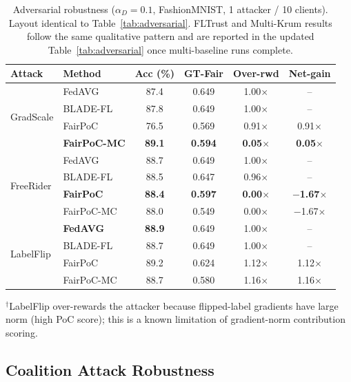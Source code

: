 \documentclass[journal]{IEEEtran}
\theoremstyle{definition}
\theoremstyle{remark}
\begin{document}
\begin{table}[t]
\caption{Adversarial robustness ($\alpha_D{=}0.1$, FashionMNIST,
1 attacker / 10 clients). Layout identical to
Table~\ref{tab:adversarial}. FLTrust and Multi-Krum results follow the same qualitative pattern
and are reported in the updated Table~\ref{tab:adversarial} once
multi-baseline runs complete.}
\label{tab:adversarial_fmnist}
\centering
\renewcommand{\arraystretch}{1.1}
\setlength{\tabcolsep}{3pt}
\begin{tabular}{llcccc}
\toprule
\textbf{Attack} & \textbf{Method} & \textbf{Acc (\%)} & \textbf{GT-Fair} & \textbf{Over-rwd} & \textbf{Net-gain} \\
\midrule
\multirow{4}{*}{GradScale}
 & FedAVG         & 87.4 & 0.649 & 1.00$\times$ & -- \\
 & BLADE-FL       & 87.8 & 0.649 & 1.00$\times$ & -- \\
 & FairPoC        & 76.5 & 0.569 & 0.91$\times$ & 0.91$\times$ \\
 & \textbf{FairPoC-MC} & \textbf{89.1} & \textbf{0.594} & \textbf{0.05}$\times$ & \textbf{0.05}$\times$ \\
\midrule
\multirow{4}{*}{FreeRider}
 & FedAVG         & 88.7 & 0.649 & 1.00$\times$ & -- \\
 & BLADE-FL       & 88.5 & 0.647 & 0.96$\times$ & -- \\
 & \textbf{FairPoC}    & \textbf{88.4} & \textbf{0.597} & \textbf{0.00}$\times$ & \textbf{$-$1.67}$\times$ \\
 & FairPoC-MC     & 88.0 & 0.549 & 0.00$\times$ & $-$1.67$\times$ \\
\midrule
\multirow{4}{*}{LabelFlip}
 & \textbf{FedAVG}     & \textbf{88.9} & 0.649 & 1.00$\times$ & -- \\
 & BLADE-FL       & 88.7 & 0.649 & 1.00$\times$ & -- \\
 & FairPoC        & 89.2 & 0.624 & 1.12$\times$ & 1.12$\times$ \\
 & FairPoC-MC     & 88.7 & 0.580 & 1.16$\times$ & 1.16$\times$ \\
\bottomrule
\end{tabular}
\vspace{2pt}
\footnotesize $^{\dagger}$LabelFlip over-rewards the attacker because
flipped-label gradients have large norm (high PoC score);
this is a known limitation of gradient-norm contribution scoring.
\end{table}

\subsection{Coalition Attack Robustness}
\label{subsec:coalition}
\end{document}
